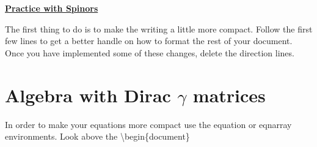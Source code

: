 \documentclass[12pt]{article}
\def \ga{\gamma}
\begin{document}
\begin{center}
\underline{\textbf{\Large Practice with Spinors}}
\end{center}

The first thing to do is to make the writing a little more compact. Follow the first few lines to get a better handle on how to format the rest of your document. Once you have implemented some of these changes, delete the direction lines.

\section{Algebra with Dirac $\ga$ matrices}

In order to make your equations more compact use the equation or eqnarray environments. Look above the \textbackslash begin\{document\} 
\end{document}
